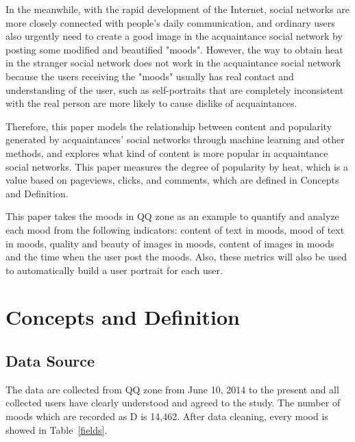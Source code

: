 \documentclass[10pt,twocolumn,letterpaper]{article}
\begin{document}
    In the meanwhile, with the rapid development of the Internet, social networks are more closely connected with people's daily communication, and ordinary users also urgently need to create a good image in the acquaintance social network by posting some modified and beautified "moods".
    However, the way to obtain heat in the stranger social network does not work in the acquaintance social network because the users receiving the "moods" usually has real contact and understanding of the user, such as self-portraits that are completely inconsistent with the real person are more likely to cause dislike of acquaintances.

    Therefore, this paper models the relationship between content and popularity generated by acquaintances' social networks through machine learning and other methods, and explores what kind of content is more popular in acquaintance social networks.
    This paper measures the degree of popularity by heat, which is a value based on pageviews, clicks, and comments, which are defined in Concepts and Definition.

    This paper takes the moods in QQ zone as an example to quantify and analyze each mood from the following indicators: content of text in moods, mood of text in moods, quality and beauty of images in moods, content of images in moods and the time when the user post the moods.
    Also, these metrics will also be used to automatically build a user portrait for each user.

\section{Concepts and Definition}

\subsection{Data Source}
    The data are collected from QQ zone from June 10, 2014 to the present and all collected users have clearly understood and agreed to the study.
    The number of moods which are recorded as D is 14,462.
    After data cleaning, every mood is showed in Table~\ref{fields}.
\end{document}
